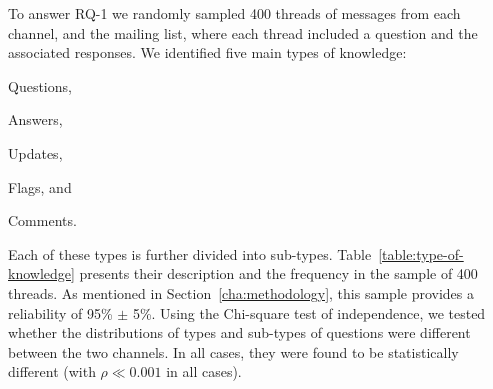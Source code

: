 To answer RQ-1 we randomly sampled 400 threads of messages from each channel, \SO and the \RH mailing list, where each thread included a question and the associated responses. We identified five main types of knowledge:
\begin{enumerate*}[label=(\arabic*)]
\item Questions,
\item Answers,
\item Updates,
\item Flags, and
\item Comments.
\end{enumerate*}
Each of these types is further divided into sub-types. Table~\ref{table:type-of-knowledge} presents their description and the frequency in the sample of 400 threads. As mentioned in Section~\ref{cha:methodology}, this sample provides a reliability of 95\% $\pm$ 5\%. Using the Chi-square test of independence, we tested whether the distributions of types and sub-types of questions were different between the two channels.  In
all cases, they were found to be statistically different (with $\rho \ll 0.001$ in all cases).
